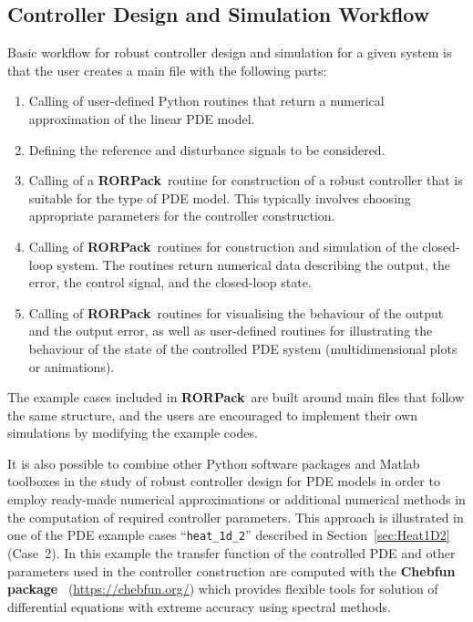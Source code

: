 \documentclass[11pt, a4paper]{amsart}
\theoremstyle{definition}
\numberwithin{equation}{section}
\newcommand{\RORname}{\textbf{RORPack}}
\begin{document}
\subsection{Controller Design and Simulation Workflow}

Basic workflow for robust controller design and simulation for a given system is that the user creates a main file with the following parts:
\begin{enumerate}
  \item Calling of user-defined Python routines that return a numerical approximation of the linear PDE model.
  \item Defining the reference and disturbance signals to be considered.
  \item Calling of a \RORname\ routine for construction of a robust controller that is suitable for the type of PDE model.
    This typically involves choosing appropriate parameters for the controller construction.
  \item Calling of \RORname\ routines for construction and simulation of the closed-loop system. The routines return numerical data describing the output, the error, the control signal, and the closed-loop state.
  \item Calling of \RORname\ routines for visualising the behaviour of the output and the output error, as well as 
    user-defined routines for illustrating the behaviour of the state of the controlled PDE system (multidimensional plots or animations).
\end{enumerate}
The example cases included in \RORname\ are built around main files that follow the same structure, and the users are encouraged to implement their own simulations by modifying the example codes.

It is also possible to combine other Python software packages and Matlab toolboxes in the study of robust controller design for PDE models in order to employ ready-made numerical approximations or additional numerical methods in the computation of required controller parameters. This approach is illustrated in one of the PDE example cases ``\texttt{heat\_1d\_2}'' described in Section~\ref{sec:Heat1D2} (Case~2). 
In this example the transfer function of the controlled PDE and other parameters used in the controller construction are computed with the \textbf{Chebfun package}~\cite{DriHal14book,Tre13book} (\href{https://chebfun.org/}{https://chebfun.org/}) which provides flexible tools for solution of differential equations with extreme accuracy using spectral methods. 
\end{document}
